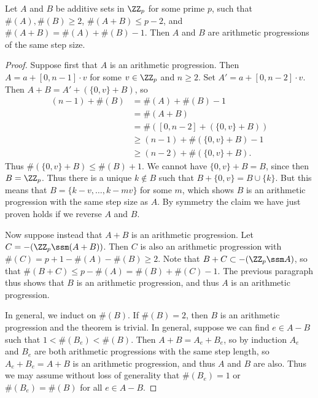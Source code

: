 \begin{lemma}
    Let $A$ and $B$ be additive sets in $\ZZ_p$ for some prime $p$, such that $\#(A), \#(B) \geq 2$, $\#(A + B) \leq p - 2$, and $\#(A + B) = \#(A) + \#(B) - 1$. Then $A$ and $B$ are arithmetic progressions of the same step size.
\end{lemma}
\begin{proof}
    Suppose first that $A$ is an arithmetic progression. Then $A = a + [0,n-1] \cdot v$ for some $v \in \ZZ_p$ and $n \geq 2$. Set $A' = a + [0,n-2] \cdot v$. Then $A + B = A' + (\{ 0, v \} + B)$, so
    \begin{align*}
        (n-1) + \#(B) &= \#(A) + \#(B) - 1\\
        &= \#(A + B)\\
        &= \#([0,n-2] + (\{ 0, v \} + B))\\
        &\geq (n-1) + \#(\{ 0, v \} + B) - 1\\
        &\geq (n-2) + \#(\{ 0, v \} + B).
    \end{align*}
    Thus $\#( \{ 0, v \} + B) \leq \#(B) + 1$. We cannot have $\{ 0, v \} + B = B$, since then $B = \ZZ_p$. Thus there is a unique $k \not \in B$ such that $B + \{ 0, v \} = B \cup \{ k \}$. But this means that $B = \{ k - v, \dots, k - mv \}$ for some $m$, which shows $B$ is an arithmetic progression with the same step size as $A$. By symmetry the claim we have just proven holds if we reverse $A$ and $B$.

    Now suppose instead that $A + B$ is an arithmetic progression. Let $C = - (\ZZ_p \ssm (A + B))$. Then $C$ is also an arithmetic progression with $\#(C) = p + 1 - \#(A) - \#(B) \geq 2$. Note that $B + C \subset -(\ZZ_p \ssm A)$, so that $\#(B + C) \leq p - \#(A) = \#(B) + \#(C) - 1$. The previous paragraph thus shows that $B$ is an arithmetic progression, and thus $A$ is an arithmetic progression.

    In general, we induct on $\#(B)$. If $\#(B) = 2$, then $B$ is an arithmetic progression and the theorem is trivial. In general, suppose we can find $e \in A - B$ such that $1 < \#(B_e) < \#(B)$. Then $A + B = A_e + B_e$, so by induction $A_e$ and $B_e$ are both arithmetic progressions with the same step length, so $A_e + B_e = A + B$ is an arithmetic progression, and thus $A$ and $B$ are also. Thus we may assume without loss of generality that $\#(B_e) = 1$ or $\#(B_e) = \#(B)$ for all $e \in A - B$.


\end{proof}
